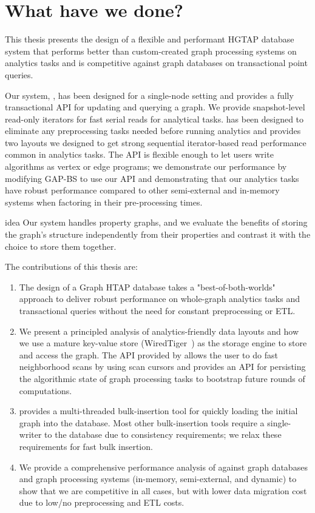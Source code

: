 \section{What have we done?}
This thesis presents the design of a flexible and performant \ac{HGTAP} database system that performs better than custom-created graph processing systems on analytics tasks and is competitive against graph databases on transactional point queries.

Our system, \project{}, has been designed for a single-node setting and provides a fully transactional API for updating and querying a graph. We provide snapshot-level read-only iterators for fast serial reads for analytical tasks.
\project{} has been designed to eliminate any preprocessing tasks needed before running analytics and provides two layouts we designed to get strong sequential iterator-based read performance common in analytics tasks.
The API is flexible enough to let users write algorithms as vertex or edge programs; we demonstrate our performance by modifying GAP-BS to use our API and demonstrating that our analytics tasks have robust performance compared to other semi-external and in-memory systems when factoring in their pre-processing times.
\begin{statusbar}{idea}
    Our system handles property graphs, and we evaluate the benefits of storing the graph's structure independently from their properties and contrast it with the choice to store them together. 
\end{statusbar}

The contributions of this thesis are:
\begin{enumerate}
    \item The design of a Graph HTAP database takes a "best-of-both-worlds" approach to deliver robust performance on whole-graph analytics tasks and transactional queries without the need for constant preprocessing or ETL.
    \item We present a principled analysis of analytics-friendly data layouts and how we use a mature key-value store (WiredTiger~\cite{WiredTigerDocumentation}) as the storage engine to store and access the graph. The API provided by \project{} allows the user to do fast neighborhood scans by using scan cursors and provides an API for persisting the algorithmic state of graph processing tasks to bootstrap future rounds of computations.
    \item \project{} provides a multi-threaded bulk-insertion tool for quickly loading the initial graph into the database. Most other bulk-insertion tools require a single-writer to the database due to consistency requirements; we relax these requirements for fast bulk insertion.
    \item We provide a comprehensive performance analysis of \project{} against graph databases and graph processing systems (in-memory, semi-external, and dynamic) to show that we are competitive in all cases, but with lower data migration cost due to low/no preprocessing and ETL costs.
    \end{enumerate}

